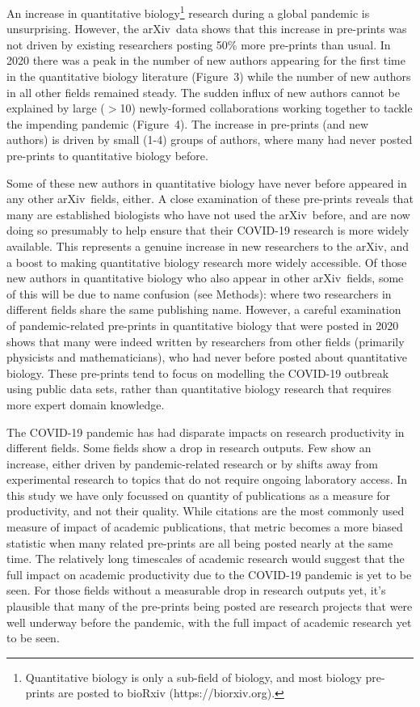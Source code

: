 \documentclass[a4paper,12pt]{article}
\newcommand{\arxiv}{arXiv}
\begin{document}
 
An increase in quantitative biology\footnote{Quantitative biology is only a sub-field of biology, and most biology pre-prints are posted to bioRxiv ({https://biorxiv.org}).} research during a global pandemic is unsurprising. However, the \arxiv\ data shows that this increase in pre-prints was not driven by existing researchers posting 50\% more pre-prints than usual. In 2020 there was a peak in the number of new authors appearing for the first time in the quantitative biology literature (Figure~3) while the number of new authors in all other fields remained steady. The sudden influx of new authors cannot be explained by large ($>$10) newly-formed collaborations working together to tackle the impending pandemic (Figure~4). The increase in pre-prints (and new authors) is driven by small (1-4) groups of authors, where many had never posted pre-prints to quantitative biology before.


Some of these new authors in quantitative biology have never before appeared in any other \arxiv\ fields, either.
A close examination of these pre-prints reveals that many are established biologists who have not used the \arxiv\ before, and are now doing so presumably to help ensure that their COVID-19 research is more widely available. This represents a genuine increase in new researchers to the \arxiv, and a boost to making quantitative biology research more widely accessible. Of those new authors in quantitative biology who also appear in other \arxiv\ fields, some of this will be due to name confusion (see Methods): where two researchers in different fields share the same publishing name. However, a careful examination of pandemic-related pre-prints in quantitative biology that were posted in 2020 shows that many were indeed written by researchers from other fields (primarily physicists and mathematicians), who had never before posted about quantitative biology. These pre-prints tend to focus on modelling the COVID-19 outbreak using public data sets, rather than quantitative biology research that requires more expert domain knowledge. 



The COVID-19 pandemic has had disparate impacts on research productivity in different fields. Some fields show a drop in research outputs. Few show an increase, either driven by pandemic-related research or by shifts away from experimental research to topics that do not require ongoing laboratory access. In this study we have only focussed on quantity of publications as a measure for productivity, and not their quality. While citations are the most commonly used measure of impact of academic publications, that metric becomes a more biased statistic when many related pre-prints are all being posted nearly at the same time. 
The relatively long timescales of academic research would suggest that the full impact on academic productivity due to the COVID-19 pandemic is yet to be seen. For those fields without a measurable drop in research outputs yet, it's plausible that many of the pre-prints being posted are research projects that were well underway before the pandemic, with the full impact of academic research yet to be seen.
\end{document}
